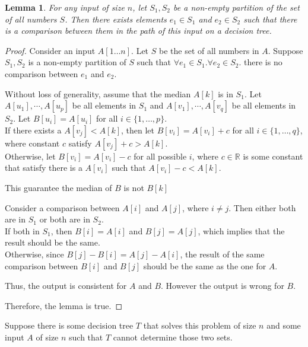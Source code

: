 \documentclass[10pt]{article}
\newtheorem{lemma}[theorem]{Lemma}
\begin{document}
\begin{enumerate}
\begin{comment}
	However, the output for $B$ is not correct. 
	This is a contradiction.
	
	Therefore, the lemma is true.
	\end{proof}
	\end{comment}

	\begin{lemma}
	For any input of size $n$, let $S_1, S_2$ be a non-empty partition of the set of
	all numbers $S$. 
	Then there exists elements $e_1 \in S_1$ and $e_2 \in S_2$ such that there
	is a comparison between them in the path of this input on a decision tree.
	\end{lemma}

	\begin{proof}
		Consider an input $A[1 \ldots n]$.
		Let $S$ be the set of all numbers in $A$.
		Suppose $S_1, S_2$ is a non-empty partition of $S$ such that $\forall e_1
		\in S_1. \forall e_2 \in S_2.$ there is no comparison between $e_1$ and
		$e_2$.
	
		Without loss of generality, assume that the median $A[k]$ is in $S_1$.
		Let $A[u_1], \cdots, A[u_p]$ be all elements in $S_1$ and $A[v_1],
		\cdots, A[v_q]$ be all elements in $S_2$. 
		Let $B[u_i] = A[u_i]$ for all $i \in \{1, \ldots, p\}$. \\
		If there exists a $A[v_j] < A[k]$, then let $B[v_i] = A[v_i] + c$ for
		all $i \in \{1, \ldots, q\}$, where constant $c$ satisfy $A[v_j] + c >
		A[k]$. \\
		Otherwise, let $B[v_i] = A[v_i] - c$ for all possible $i$, where $c \in
		\mathbb{R}$ is some constant that satisfy there is a $A[v_i]$ such that
		$A[v_i] - c < A[k]$. 

		This guarantee the median of $B$ is not $B[k]$

		Consider a comparison between $A[i]$ and $A[j]$, where $i \neq j$.
		Then either both are in $S_1$ or both are in $S_2$. \\
		If both in $S_1$, then $B[i] = A[i]$ and $B[j] = A[j]$, which implies
		that the result should be the same. \\
		Otherwise, since $B[j] - B[i] = A[j] - A[i]$, the result of the same
		comparison between $B[i]$ and $B[j]$ should be the same as the one for
		$A$. 

		Thus, the output is consistent for $A$ and $B$. 
		However the output is wrong for $B$.

		Therefore, the lemma is true.
	\end{proof}

	Suppose there is some decision tree $T$ that solves this problem of size
	$n$ and some input $A$ of size $n$ such that $T$ cannot determine those two
	sets.


\end{enumerate}
\end{document}
